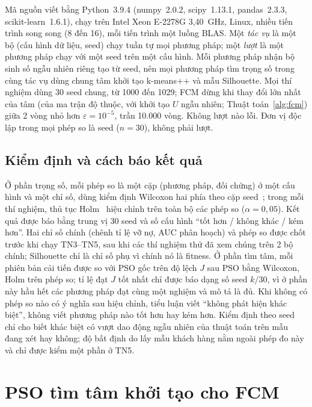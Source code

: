 Mã nguồn viết bằng Python~3.9.4 (numpy~2.0.2, scipy~1.13.1, pandas~2.3.3, scikit-learn~1.6.1), chạy trên Intel Xeon
E-2278G 3,40~GHz, Linux, nhiều tiến trình song song (8 đến 16), mỗi tiến trình một luồng BLAS. Một \emph{tác vụ} là một bộ
(cấu hình dữ liệu, seed) chạy tuần tự mọi phương pháp; một \emph{lượt} là một phương pháp chạy với một seed trên một cấu hình.
Mỗi phương pháp nhận bộ sinh số ngẫu nhiên riêng tạo từ seed, nên mọi phương pháp tìm trọng số trong cùng tác vụ dùng chung tâm
khởi tạo k-means++ và mẫu Silhouette. Mọi thí nghiệm dùng 30 seed chung, từ 1000 đến 1029; FCM dừng khi thay đổi lớn nhất của
tâm (của ma trận độ thuộc, với khởi tạo $U$ ngẫu nhiên; Thuật toán~\ref{alg:fcm}) giữa 2 vòng nhỏ hơn
$\varepsilon = 10^{-5}$, trần 10.000 vòng. Không lượt nào lỗi. Đơn vị độc lập trong mọi phép so là seed ($n = 30$), không
phải lượt.

\subsection{Kiểm định và cách báo kết quả}
\label{sec:kiem-dinh}

Ở phần trọng số, mỗi phép so là một cặp (phương pháp, đối chứng) ở một cấu hình và một chỉ số, dùng kiểm định Wilcoxon hai phía
theo cặp seed~\parencite{wilcoxon1945}; trong mỗi thí nghiệm, thủ tục Holm~\parencite{holm1979} hiệu chỉnh trên toàn bộ các
phép so ($\alpha = 0{,}05$). Kết quả được báo bằng trung vị 30 seed và số cấu hình ``tốt hơn / không khác / kém hơn''. Hai chỉ
số chính (chênh tỉ lệ vỡ nợ, AUC phân hoạch) và phép so được chốt trước khi chạy TN3--TN5, sau khi các thí nghiệm thử đã
xem chúng trên 2 bộ chính; Silhouette chỉ là chỉ số phụ vì chính nó là
fitness. Ở phần tìm tâm, mỗi phiên bản cải tiến được so với PSO gốc trên độ lệch $J$ sau PSO bằng Wilcoxon, Holm trên
\soLieuENamKdSoPhep{} phép so; tỉ lệ đạt $J$ tốt nhất chỉ được báo dạng số seed $k/30$, vì ở phần này hầu hết các
phương pháp đạt cùng một nghiệm và mô tả là đủ. Khi không có phép so nào có ý nghĩa sau hiệu chỉnh, tiểu luận viết ``không
phát hiện khác biệt'', không viết phương pháp nào tốt hơn hay kém hơn. Kiểm định theo seed chỉ cho biết khác biệt có vượt dao động ngẫu nhiên
của thuật toán trên mẫu đang xét hay không; độ bất định do lấy mẫu khách hàng nằm ngoài phép đo này và chỉ được kiểm một phần ở TN5.

\section{PSO tìm tâm khởi tạo cho FCM}
\label{sec:diem-xuat-phat}

